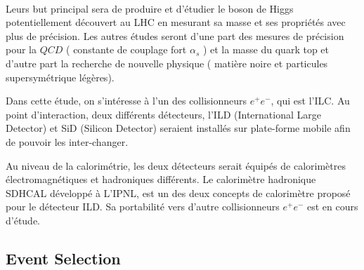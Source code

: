 ~\par Leurs but principal sera de produire et d'\'etudier le boson de Higgs potentiellement d\'ecouvert au LHC en mesurant sa masse et ses propri\'et\'es avec plus de pr\'ecision. Les autres \'etudes seront d'une part des mesures de pr\'ecision pour la $QCD$ ( constante de couplage fort $\alpha_{s}$ ) et la masse du quark top et d'autre part la recherche de nouvelle physique ( mati\`ere noire et particules supersym\'etrique l\'eg\`eres).
~\par Dans cette \'etude, on s'int\'eresse \`a l'un des collisionneurs $e^+e^-$, qui est l'ILC. Au point d'interaction, deux diff\'erents d\'etecteurs, l'ILD (International Large Detector) et SiD (Silicon Detector) seraient install\'es sur plate-forme mobile afin de pouvoir les inter-changer.
~\par Au niveau de la calorim\'etrie, les deux d\'etecteurs serait \'equip\'es de calorim\`etres \'electromagn\'etiques et hadroniques diff\'erents. Le calorim\`etre hadronique SDHCAL d\'evelopp\'e \`a L'IPNL, est un des deux concepts de calorimètre proposé pour le détecteur ILD. Sa portabilité vers d'autre collisionneurs $e^+e^-$ est en cours d'étude.

\subsection{Event Selection}

